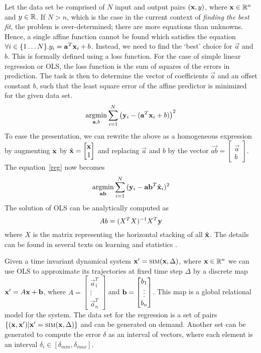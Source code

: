 
Let the data set be comprised of $N$ input and output pairs $(\mathbf{x},
y)$, where $\mathbf{x}\in\mathbb{R}^n$ and $y\in\mathbb{R}$. If $N>n$, which is
the case in the current context of \textit{finding the best fit}, the
problem is over-determined; there are more equations than
unknowns. Hence, a single affine function cannot be found which
satisfies the equation $\forall i\in\{1\ldots N\}. y_i = \mathbf{a}^T\mathbf{x}_i + b$. Instead, we
need to find the `best' choice for $\vec{a}$ and $b$. This is formally
defined using a loss function. For the case of simple linear
regression or OLS, the loss function is the sum of squares of the
errors in prediction.  The task is then to determine the vector of
coefficients $\vec{a}$ and an offset constant $b$, such that the least
square error of the affine predictor is minimized for the given data
set.
\begin{equation}
    \operatornamewithlimits{argmin}_{\vec{a}, b}\displaystyle\sum_{i=1}^{N}{\left(\y_i - (\vec{a}^T\x_i + b)\right)^2}
\label{reg}
\end{equation}
To ease the presentation, we can rewrite the above as a homogeneous
expression by augmenting $\mathbf{x}$ by $\hat{\mathbf{x}} = \begin{bmatrix}\mathbf{x} \\ 1\end{bmatrix}$ and replacing $\vec{a}$ and $b$ by the vector
$\vec{ab} = \begin{bmatrix}\vec{a} \\ b \end{bmatrix}$. The equation~\ref{reg} now becomes
\[
    \operatornamewithlimits{argmin}_{\vec{ab}}\displaystyle\sum_{i=1}^{N}{(\y_i - \vec{ab}^T \hat{\x}_i)^2}
\]
The solution of OLS can be analytically computed as
\[ Ab = (X^TX)^{-1}X^T\mathbf{y}\]
where $X$ is the matrix representing the horizontal stacking of all
$\hat{\mathbf{x}}$.
The details can be found in several texts on learning and statistics
\cite{friedman2001elements}.

Given a time invariant dynamical system $\mathbf{x}' = \mbox{\sc sim}(\mathbf{x}, \Delta)$,
where $\mathbf{x}\in\mathbb{R}^n$ we can use OLS to approximate its trajectories
at fixed time step $\Delta$ by a discrete map $\mathbf{x}' = A\mathbf{x} + \mathbf{b}$, where
$A = \begin{bmatrix}\vec{a}_1^T \\ \vdots \\ \vec{a}_n^T \end{bmatrix}$ and $\mathbf{b} =
\begin{bmatrix}b_1 \\ \vdots \\ b_n \end{bmatrix}$. This map is a
    global relational model for the system. The data set for the
    regression is a set of pairs $\{(\mathbf{x},\mathbf{x}') | \mathbf{x}' =
    \mbox{\sc sim}(\mathbf{x}, \Delta)\}$ and can be generated on demand. Another
    set can be generated to compute the error $\delta$ as an interval
    of vectors, where each element is an interval $\delta_i \in
    [\delta_{min}, \delta_{max}]$.
    
